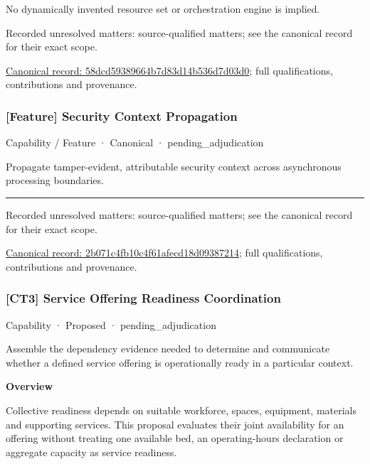 No dynamically invented resource set or orchestration engine is implied.


{\small Recorded unresolved matters: source-qualified matters; see the canonical record for their exact scope.}\par
{\footnotesize \href{../../../../continuum/strategy/capability/feature/58dcd59389664b7d83d14b536d7d03d0.md}{Canonical record: 58dcd59389664b7d83d14b536d7d03d0}; full qualifications, contributions and provenance.}\par
\subsubsection{[Feature] Security Context Propagation}

\label{element:2b071c4fb10c4f61afecd18d09387214}
{\small Capability / Feature · Canonical · pending\_adjudication}\par

Propagate tamper-evident, attributable security context across asynchronous processing boundaries.



\medskip\hrule\medskip

{\small Recorded unresolved matters: source-qualified matters; see the canonical record for their exact scope.}\par
{\footnotesize \href{../../../../continuum/strategy/capability/feature/2b071c4fb10c4f61afecd18d09387214.md}{Canonical record: 2b071c4fb10c4f61afecd18d09387214}; full qualifications, contributions and provenance.}\par
\subsubsection{[CT3] Service Offering Readiness Coordination}

\label{element:0caecaba5d3e4781b8671b12c13ee283}
{\small Capability · Proposed · pending\_adjudication}\par

Assemble the dependency evidence needed to determine and communicate whether a defined service offering is operationally ready in a particular context.



\textbf{Overview}



Collective readiness depends on suitable workforce, spaces, equipment, materials and supporting services. This proposal evaluates their joint availability for an offering without treating one available bed, an operating-hours declaration or aggregate capacity as service readiness.



